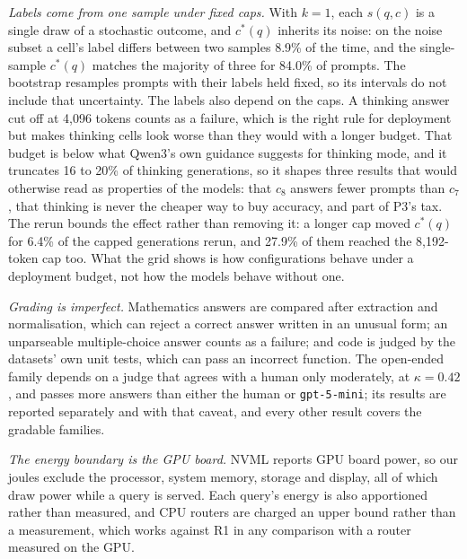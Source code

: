 \documentclass[final,5p,times,twocolumn]{elsarticle}
\theoremstyle{plain}
\newcommand{\cstar}{c^{*}}
\begin{document}
\emph{Labels come from one sample under fixed caps.} With $k = 1$, each
$s(q, c)$ is a single draw of a stochastic outcome, and $\cstar(q)$ inherits
its noise: on the noise subset a cell's label differs between two samples
8.9\% of the time, and the single-sample $\cstar(q)$ matches the majority of
three for 84.0\% of prompts. The bootstrap resamples prompts with their
labels held fixed, so its intervals do not include that uncertainty. The
labels also depend on the caps. A thinking answer cut off at 4{,}096 tokens
counts as a failure, which is the right rule for deployment but makes
thinking cells look worse than they would with a longer budget. That budget
is below what Qwen3's own guidance suggests for thinking mode, and it
truncates 16 to 20\% of thinking generations, so it shapes three results that
would otherwise read as properties of the models: that $c_8$ answers fewer
prompts than $c_7$, that thinking is never the cheaper way to buy accuracy,
and part of P3's tax. The rerun bounds the effect rather than removing it: a
longer cap moved $\cstar(q)$ for 6.4\% of the capped generations rerun, and
27.9\% of them reached the 8{,}192-token cap too. What the grid shows is how
configurations behave under a deployment budget, not how the models behave
without one.

\emph{Grading is imperfect.} Mathematics answers are compared after
extraction and normalisation, which can reject a correct answer written in an
unusual form; an unparseable multiple-choice answer counts as a failure; and
code is judged by the datasets' own unit tests, which can pass an incorrect
function. The open-ended family depends on a judge that agrees with a human
only moderately, at $\kappa = 0.42$, and passes more answers than either the
human or \texttt{gpt-5-mini}; its results are reported separately and with
that caveat, and every other result covers the gradable families.

\emph{The energy boundary is the GPU board.} NVML reports GPU board power, so
our joules exclude the processor, system memory, storage and display, all of
which draw power while a query is served. Each query's energy is also
apportioned rather than measured, and CPU routers are charged an upper bound
rather than a measurement, which works against R1 in any comparison with a
router measured on the GPU.
\end{document}

